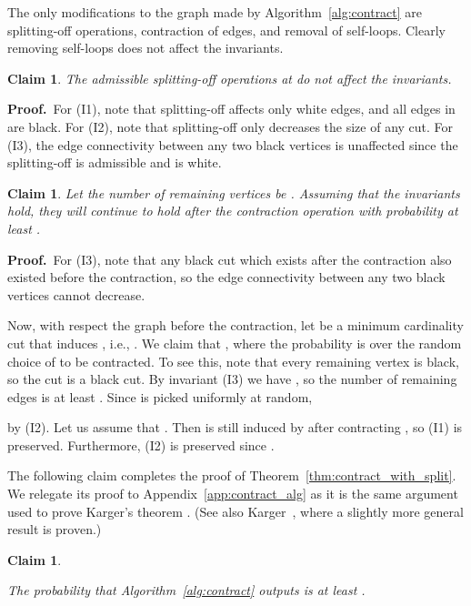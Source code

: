 \documentclass[11pt]{article}
\newcommand{\proofbelow}{8pt}
\numberwithin{equation}{section}
\newtheorem{claim}[theorem]{Claim}
\renewenvironment{proof}{\noindent\textbf{Proof.}\,}{\afterproof}
\newcommand{\afterproof}{\hfill  \par \vspace{\proofbelow}}
\newcommand{\Algorithm}[1]{Algorithm~\ref{alg:#1}}
\newcommand{\Appendix}[1]{Appendix~\ref{app:#1}}
\newcommand{\ClaimName}[1]{\label{clm:#1}}
\newcommand{\Theorem}[1]{Theorem~\ref{thm:#1}}
\begin{document}
The only modifications to the graph made by \Algorithm{contract}
are splitting-off operations, contraction of edges, and removal of self-loops.
Clearly removing self-loops does not affect the invariants.

\begin{claim}
\ClaimName{splitoff}
The admissible splitting-off operations at  do not affect the invariants.
\end{claim}
\begin{proof}
For (I1), note that splitting-off affects only white edges, and all edges in  are black.
For (I2), note that splitting-off only decreases the size of any cut.
For (I3), the edge connectivity between any two black vertices is unaffected
since the splitting-off is admissible and  is white.
\end{proof}


\begin{claim}
\ClaimName{contract}
Let the number of remaining vertices be .
Assuming that the invariants hold,
they will continue to hold after the contraction operation
with probability at least .
\end{claim}
\begin{proof}
For (I3), note that
any black cut which exists after the contraction
also existed before the contraction,
so the edge connectivity between any two black vertices cannot decrease.

Now, with respect the graph before the contraction,
let  be a minimum cardinality cut that induces ,
i.e., .
We claim that ,
where the probability is over the random choice of  to be contracted.
To see this, note that every remaining vertex  is black, 
so the cut  is a black cut.
By invariant (I3) we have ,
so the number of remaining edges is at least .
Since  is picked uniformly at random,

by (I2).
Let us assume that .
Then  is still induced by  after contracting , so (I1) is preserved. 
Furthermore, (I2) is preserved since .
\end{proof}

The following claim completes the proof of \Theorem{contract_with_split}.
We relegate its proof to \Appendix{contract_alg} as it is the same argument used
to prove Karger's theorem \cite{KargerContract,KargerStein}.
(See also Karger~\cite[App.~A]{KargerSkel}, where a slightly more general result is proven.)

\newcommand{\clmoutput}{
    The probability that \Algorithm{contract} outputs  is at least .
}
\begin{claim}
\ClaimName{output}
\clmoutput
\end{claim}
\end{document}
